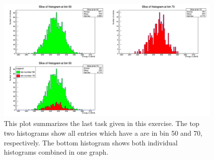 \documentclass[10pt]{article}
\newenvironment{myfont}{\fontfamily{put}\selectfont}{\par}
\begin{document}
\begin{myfont}
\begin{figure}[H]
\centering
\caption{This plot summarizes the last task given in this exercise.
The top two histograms show all entries which have a are in bin 50 and 70, respectively.
The bottom histogram shows both individual histograms combined in one graph.}
\includegraphics[width = \textwidth]{./canvas2.png}
\end{figure}

\end{myfont}
\end{document}
